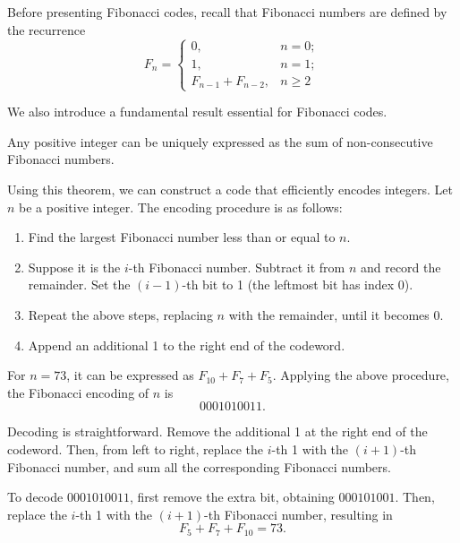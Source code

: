 \documentclass{subfiles}
\begin{document}
    Before presenting Fibonacci codes, recall that Fibonacci numbers are defined 
    by the recurrence
    \[
        F_n = 
        \begin{cases}
            0, & n = 0; \\
            1, & n = 1; \\ 
            F_{n-1} + F_{n-2}, & n \ge 2
        \end{cases}
    \]

    We also introduce a fundamental result essential for Fibonacci codes.

    \begin{theorem*}[Zeckendorf]
        Any positive integer can be uniquely expressed as the sum of 
        non-consecutive Fibonacci numbers.
    \end{theorem*}

    Using this theorem, we can construct a code that efficiently encodes 
    integers. Let \(n\) be a positive integer. The encoding procedure is as 
    follows:
    \begin{enumerate}
        \item Find the largest Fibonacci number less than or equal to \(n\).

        \item Suppose it is the \(i\)-th Fibonacci number. Subtract it from 
              \(n\) and record the remainder. Set the \((i-1)\)-th bit to 1 
              (the leftmost bit has index 0).

        \item Repeat the above steps, replacing \(n\) with the remainder, 
              until it becomes 0.

        \item Append an additional 1 to the right end of the codeword.
    \end{enumerate}

    \begin{example*}
        For \(n = 73\), it can be expressed as 
        \(F_{10} + F_7 + F_5\). Applying the above procedure, the Fibonacci 
        encoding of \(n\) is 
        \[
            0001010011.
        \]
    \end{example*}

    Decoding is straightforward. Remove the additional 1 at the right end of 
    the codeword. Then, from left to right, replace the \(i\)-th 1 with the 
    \((i+1)\)-th Fibonacci number, and sum all the corresponding Fibonacci 
    numbers.

    \begin{example*}
        To decode \(0001010011\), first remove the extra bit, obtaining 
        \(000101001\). Then, replace the \(i\)-th 1 with the \((i+1)\)-th 
        Fibonacci number, resulting in
        \[
            F_{5} + F_{7} + F_{10} = 73.
        \]
    \end{example*}
    \clearpage
\end{document}

